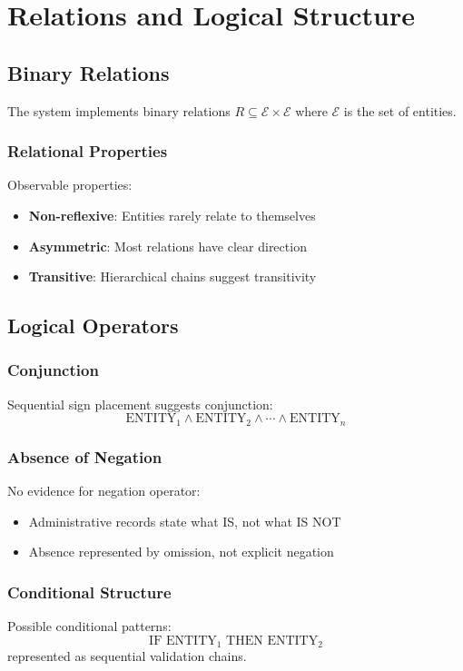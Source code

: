 \section{Relations and Logical Structure}

\subsection{Binary Relations}

The system implements binary relations $R \subseteq \mathcal{E} \times \mathcal{E}$ where $\mathcal{E}$ is the set of entities.

\subsubsection{Relational Properties}
Observable properties:
\begin{itemize}
    \item \textbf{Non-reflexive}: Entities rarely relate to themselves
    \item \textbf{Asymmetric}: Most relations have clear direction
    \item \textbf{Transitive}: Hierarchical chains suggest transitivity
\end{itemize}

\subsection{Logical Operators}

\subsubsection{Conjunction}
Sequential sign placement suggests conjunction:
\[
\text{ENTITY}_1 \land \text{ENTITY}_2 \land \cdots \land \text{ENTITY}_n
\]

\subsubsection{Absence of Negation}
No evidence for negation operator:
\begin{itemize}
    \item Administrative records state what IS, not what IS NOT
    \item Absence represented by omission, not explicit negation
\end{itemize}

\subsubsection{Conditional Structure}
Possible conditional patterns:
\[
\text{IF } \text{ENTITY}_1 \text{ THEN } \text{ENTITY}_2
\]
represented as sequential validation chains.

